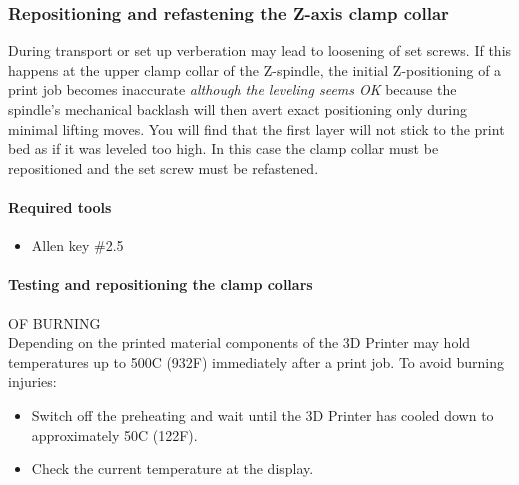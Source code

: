 \subsubsection{Repositioning and refastening the Z-axis clamp collar} \label{sec_spindlecollar}

During transport or set up verberation may lead to loosening of set screws. If this happens at the upper clamp collar of the Z-spindle, the initial Z-positioning of a print job becomes inaccurate \emph{although the leveling seems OK} because the spindle's mechanical backlash will then avert exact positioning only during minimal lifting moves. You will find that the first layer will not stick to the print bed as if it was leveled too high.
In this case the clamp collar must be repositioned and the set screw must be refastened. 

\paragraph{Required tools}

\begin{itemize}
  \item Allen key \#2.5
\end{itemize}

\paragraph{Testing and repositioning the clamp collars}

\begin{danger}
  OF BURNING\\
  Depending on the printed material components of the 3D Printer may hold 
  temperatures up to 500\degree C (932\degree F) immediately after a print job.
  To avoid burning injuries:

  \begin{itemize}
    \item Switch off the preheating and wait until the 3D Printer 
          has cooled down to approximately 50\degree C (122\degree F).
    \item Check the current temperature at the display.
  \end{itemize}
\end{danger}

